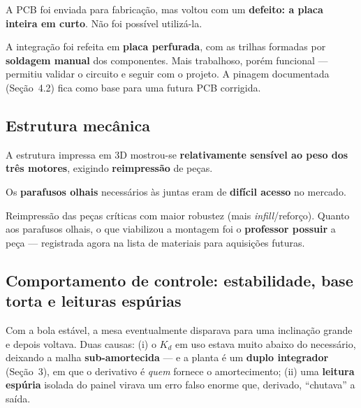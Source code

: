 \documentclass[11pt,a4paper,oneside]{article}
\begin{document}
\begin{problembox}
A PCB foi enviada para fabricação, mas voltou com um \textbf{defeito: a placa
inteira em curto}. Não foi possível utilizá-la.
\end{problembox}

\begin{solutionbox}
A integração foi refeita em \textbf{placa perfurada}, com as trilhas formadas por
\textbf{soldagem manual} dos componentes. Mais trabalhoso, porém funcional —
permitiu validar o circuito e seguir com o projeto. A pinagem documentada
(Seção~4.2) fica como base para uma futura PCB corrigida.
\end{solutionbox}

\subsection{Estrutura mecânica}

\begin{problembox}
A estrutura impressa em 3D mostrou-se \textbf{relativamente sensível ao peso dos
três motores}, exigindo \textbf{reimpressão} de peças.
\end{problembox}

\begin{problembox}
Os \textbf{parafusos olhais} necessários às juntas eram de \textbf{difícil
acesso} no mercado.
\end{problembox}

\begin{solutionbox}
Reimpressão das peças críticas com maior robustez (mais \emph{infill}/reforço).
Quanto aos parafusos olhais, o que viabilizou a montagem foi o \textbf{professor
possuir} a peça — registrada agora na lista de materiais para aquisições futuras.
\end{solutionbox}

\subsection{Comportamento de controle: estabilidade, base torta e leituras espúrias}

\begin{problembox}
Com a bola estável, a mesa eventualmente disparava para uma inclinação grande e
depois voltava. Duas causas: (i) o $K_d$ em uso estava muito abaixo do necessário,
deixando a malha \textbf{sub-amortecida} — e a planta é um \textbf{duplo
integrador} (Seção~3), em que o derivativo é \emph{quem} fornece o amortecimento;
(ii) uma \textbf{leitura espúria} isolada do painel virava um erro falso enorme que,
derivado, ``chutava'' a saída.
\end{problembox}
\end{document}
